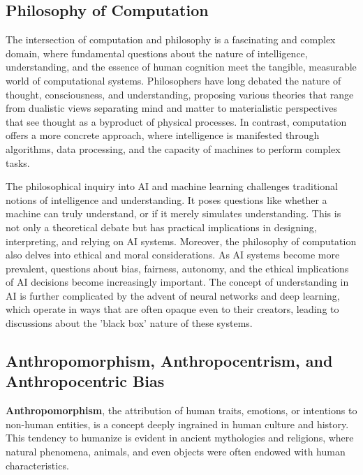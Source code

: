 \documentclass{article}
\begin{document}
\subsection{Philosophy of Computation}
\label{subsec:intro-philOfComp}
The intersection of computation and philosophy is a fascinating and complex domain, where fundamental questions about the nature of intelligence, understanding, and the essence of human cognition meet the tangible, measurable world of computational systems. 
Philosophers have long debated the nature of thought, consciousness, and understanding, proposing various theories that range from dualistic views separating mind and matter to materialistic perspectives that see thought as a byproduct of physical processes. 
In contrast, computation offers a more concrete approach, where intelligence is manifested through algorithms, data processing, and the capacity of machines to perform complex tasks.\par

The philosophical inquiry into AI and machine learning challenges traditional notions of intelligence and understanding. 
It poses questions like whether a machine can truly understand, or if it merely simulates understanding. 
This is not only a theoretical debate but has practical implications in designing, interpreting, and relying on AI systems. 
Moreover, the philosophy of computation also delves into ethical and moral considerations. 
As AI systems become more prevalent, questions about bias, fairness, autonomy, and the ethical implications of AI decisions become increasingly important.
The concept of understanding in AI is further complicated by the advent of neural networks and deep learning, which operate in ways that are often opaque even to their creators, leading to discussions about the 'black box' nature of these systems.\par

\subsection{Anthropomorphism, Anthropocentrism, and Anthropocentric Bias}
\label{subsec:intro-3anthro}
\textbf{Anthropomorphism}, the attribution of human traits, emotions, or intentions to non-human entities, is a concept deeply ingrained in human culture and history. 
This tendency to humanize is evident in ancient mythologies and religions, where natural phenomena, animals, and even objects were often endowed with human characteristics.\par
\end{document}
